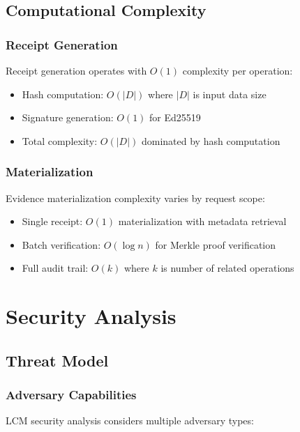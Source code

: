 \documentclass[12pt,a4paper]{article}
\begin{document}
\subsection{Computational Complexity}

\subsubsection{Receipt Generation}

Receipt generation operates with $O(1)$ complexity per operation:

\begin{itemize}
\item Hash computation: $O(|D|)$ where $|D|$ is input data size
\item Signature generation: $O(1)$ for Ed25519
\item Total complexity: $O(|D|)$ dominated by hash computation
\end{itemize}

\subsubsection{Materialization}

Evidence materialization complexity varies by request scope:

\begin{itemize}
\item Single receipt: $O(1)$ materialization with metadata retrieval
\item Batch verification: $O(\log n)$ for Merkle proof verification
\item Full audit trail: $O(k)$ where $k$ is number of related operations
\end{itemize}

\section{Security Analysis}

\subsection{Threat Model}

\subsubsection{Adversary Capabilities}

LCM security analysis considers multiple adversary types:
\end{document}
